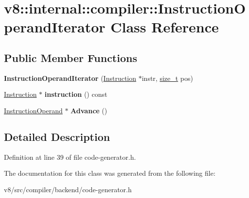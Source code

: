 \hypertarget{classv8_1_1internal_1_1compiler_1_1InstructionOperandIterator}{}\section{v8\+:\+:internal\+:\+:compiler\+:\+:Instruction\+Operand\+Iterator Class Reference}
\label{classv8_1_1internal_1_1compiler_1_1InstructionOperandIterator}
\subsection*{Public Member Functions}
\begin{DoxyCompactItemize}
\item 
\mbox{\label{classv8_1_1internal_1_1compiler_1_1InstructionOperandIterator_a14f190926e67ab3adf9a1f7df7fbcaf0}} 
{\bfseries Instruction\+Operand\+Iterator} (\mbox{\hyperlink{classv8_1_1internal_1_1compiler_1_1Instruction}{Instruction}} $\ast$instr, \mbox{\hyperlink{classsize__t}{size\+\_\+t}} pos)
\item 
\mbox{\label{classv8_1_1internal_1_1compiler_1_1InstructionOperandIterator_a8890a80d731f59d9198c3c1a80ff861d}} 
\mbox{\hyperlink{classv8_1_1internal_1_1compiler_1_1Instruction}{Instruction}} $\ast$ {\bfseries instruction} () const
\item 
\mbox{\label{classv8_1_1internal_1_1compiler_1_1InstructionOperandIterator_ad3c9891c93a16b4ba59b5e2f87325346}} 
\mbox{\hyperlink{classv8_1_1internal_1_1compiler_1_1InstructionOperand}{Instruction\+Operand}} $\ast$ {\bfseries Advance} ()
\end{DoxyCompactItemize}


\subsection{Detailed Description}


Definition at line 39 of file code-\/generator.\+h.



The documentation for this class was generated from the following file\+:\begin{DoxyCompactItemize}
\item 
v8/src/compiler/backend/code-\/generator.\+h\end{DoxyCompactItemize}
